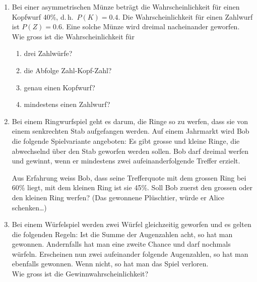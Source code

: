 \begin{ueb}
\begin{enumerate}
    \item Bei einer asymmetrischen Münze beträgt die Wahrscheinlichkeit für einen Kopfwurf 40\%, d.\,h.\ \( P(K) = 0.4 \). Die Wahrscheinlichkeit für einen Zahlwurf ist \( P(Z) = 0.6 \). Eine solche Münze wird dreimal nacheinander geworfen. Wie gross ist die Wahrscheinlichkeit für
          \begin{enumerate}
            \item drei Zahlwürfe?
            \item die Abfolge Zahl-Kopf-Zahl?
            \item genau einen Kopfwurf?
            \item mindestens einen Zahlwurf?
          \end{enumerate}


    \item Bei einem Ringwurfspiel geht es darum, die Ringe so zu werfen, dass sie von einem senkrechten Stab aufgefangen werden. Auf einem Jahrmarkt wird Bob die folgende Spielvariante angeboten: Es gibt grosse und kleine Ringe, die abwechselnd über den Stab geworfen werden sollen. Bob darf dreimal werfen und gewinnt, wenn er mindestens zwei aufeinanderfolgende Treffer erzielt.

          Aus Erfahrung weiss Bob, dass seine Trefferquote mit dem grossen Ring bei 60\% liegt, mit dem kleinen Ring ist sie 45\%.
          Soll Bob zuerst den grossen oder den kleinen Ring werfen? (Das gewonnene Plüschtier, würde er Alice schenken\dots)

    \item Bei einem Würfelspiel werden zwei Würfel gleichzeitig geworfen und es gelten die folgenden Regeln: Ist die Summe der Augenzahlen acht, so hat man gewonnen. Andernfalls hat man eine zweite Chance und darf nochmals würfeln. Erscheinen nun zwei aufeinander folgende Augenzahlen, so hat man ebenfalls gewonnen. Wenn nicht, so hat man das Spiel verloren.\\
          Wie gross ist die Gewinnwahrscheinlichkeit?

  \end{enumerate}
\end{ueb}

